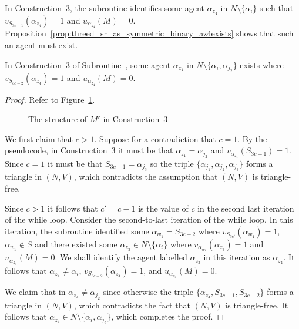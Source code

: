In Construction~3, the subroutine identifies some agent $\alpha_{z_4}$ in $N\setminus \{ \alpha_i \}$ such that $v_{S_{3c-1}}(\alpha_{z_4}) = 1$ and $u_{\alpha_{z_4}}(M) = 0$. Proposition~\ref{prop:threed_sr_as_symmetric_binary_az4exists} shows that such an agent must exist.

\begin{prop}
\label{prop:threed_sr_as_symmetric_binary_az4exists}
In Construction~3 of Subroutine~, some agent $\alpha_{z_4}$ in $N\setminus \{ \alpha_i, \alpha_{j_2} \}$ exists where $v_{S_{3c-2}}(\alpha_{z_4})=1$ and $u_{\alpha_{z_4}}(M)=0$.
\end{prop}
\begin{proof}
Refer to Figure~\ref{fig:threed_sr_as_symmetric_binary_repair_algorithm_7_cases_case_3}. 
\begin{figure}
    \centering
    
    \caption{The structure of $M'$ in Construction~3} 
    \label{fig:threed_sr_as_symmetric_binary_repair_algorithm_7_cases_case_3}
\end{figure}
We first claim that $c > 1$. Suppose for a contradiction that $c = 1$. By the pseudocode, in Construction~3 it must be that $\alpha_{z_1} = \alpha_{j_2}$ and $v_{\alpha_{z_1}}(S_{3c-1})=1$. Since $c = 1$ it must be that $S_{3c-1}=\alpha_{j_3}$ so the triple $\{ \alpha_{j_1}, \alpha_{j_2}, \alpha_{j_3} \}$ forms a triangle in $(N, V)$, which contradicts the assumption that $(N, V)$ is triangle-free.

Since $c>1$ it follows that $c'=c-1$ is the value of $c$ in the second last iteration of the while loop. Consider the second-to-last iteration of the while loop. In this iteration, the subroutine identified some $\alpha_{w_1} = S_{3c-2}$ where $v_{S_{3c'}}(\alpha_{w_1})=1$, $\alpha_{w_1}\notin S$ and there existed some $\alpha_{z_3}\in N\setminus \{ \alpha_i \}$ where $v_{\alpha_{w_1}}(\alpha_{z_3})=1$ and $u_{\alpha_{z_3}}(M) = 0$. We shall identify the agent labelled $\alpha_{z_3}$ in this iteration as $\alpha_{z_4}$. It follows that $\alpha_{z_4} \neq \alpha_i$, $v_{S_{3c - 2}}(\alpha_{z_4}) = 1$, and $u_{\alpha_{z_4}}(M)=0$.

We claim that in $\alpha_{z_4} \neq \alpha_{j_2}$ since otherwise the triple $\{ \alpha_{z_4}, S_{3c-1}, S_{3c-2} \}$ forms a triangle in $(N, V)$, which contradicts the fact that $(N, V)$ is triangle-free. It follows that $\alpha_{z_4} \in N\setminus \{ \alpha_i, \alpha_{j_2} \}$, which completes the proof.
\end{proof}

